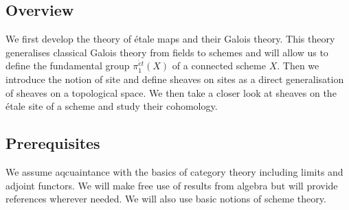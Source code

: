 \subsection{Overview}
We first develop the theory of \'etale maps and their Galois theory. This theory generalises classical Galois theory from fields to schemes and will allow us to define the fundamental group $\pi_1^{\acute{e}t}(X)$ of a connected scheme $X$. Then we introduce the notion of site and define sheaves on sites as a direct generalisation of sheaves on a topological space. We then take a closer look at sheaves on the \'etale site of a scheme and study their cohomology.
\subsection{Prerequisites}
We assume aqcuaintance with the basics of category theory including limits and adjoint functors. We will make free use of results from algebra but will provide references wherever needed. We will also use basic notions of scheme theory.

%

